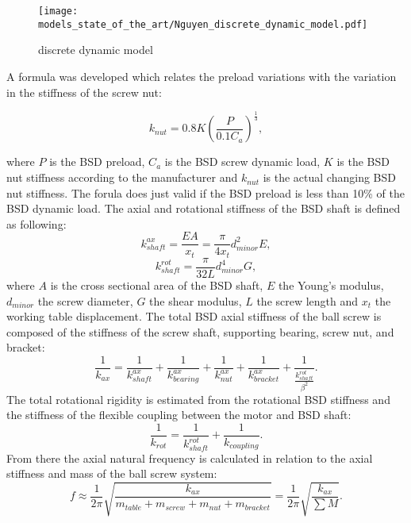 \begin{figure}[H]
  \centering
  \texttt{[image: models\_state\_of\_the\_art/Nguyen\_discrete\_dynamic\_model.pdf]}
  \caption{discrete dynamic model \cite{NGUYEN2019}}
  \label{fig:Nguyen_discrete_dynamic_model}
\end{figure}

A formula was developed which relates the preload variations with the variation in the stiffness of the screw nut: 

\begin{equation}
    k_{nut}=0.8K(\frac{P}{0.1C_{a}})^{\frac{1}{3}},
\end{equation}

where $P$ is the BSD preload, $C_{a}$ is the BSD screw dynamic load, $K$ is the BSD nut stiffness according to the manufacturer and $k_{nut}$ is the actual changing BSD nut stiffness. The forula does just valid if the BSD preload is less than 10\% of the BSD dynamic load. The axial and rotational stiffness of the BSD shaft is defined as following:
\begin{equation}
    k_{shaft}^{ax}=\frac{EA}{x_{t}}=\frac{\pi}{4x_{t}}d_{minor}^{2}E,
\end{equation}
\begin{equation}
    k_{shaft}^{rot}=\frac{\pi}{32L}d_{minor}^{4}G,
\end{equation}
 where $A$ is the cross sectional area of the BSD shaft, $E$ the Young’s modulus, $d_{minor}$ the screw diameter, $G$ the shear modulus, $L$ the screw length and $x_{t}$ the working table displacement. The total BSD axial stiffness of the ball screw is composed of the stiffness of the screw shaft, supporting bearing, screw nut, and bracket:
 \begin{equation}
    \frac{1}{k_{ax}}=\frac{1}{k_{shaft}^{ax}}+\frac{1}{k_{bearing}^{ax}}+\frac{1}{k_{nut}^{ax}}+\frac{1}{k_{bracket}^{ax}}+\frac{1}{\frac{k_{shaft}^{rot}}{\beta^{2}}}.
\end{equation}
The total rotational rigidity is estimated from the rotational BSD stiffness and the stiffness of the flexible coupling between the motor and BSD shaft:
 \begin{equation}
    \frac{1}{k_{rot}}=\frac{1}{k_{shaft}^{rot}}+\frac{1}{k_{coupling}}.
\end{equation}
From there the axial natural frequency is calculated in relation to the axial stiffness and mass of the ball screw system:
\begin{equation}
    f\approx\frac{1}{2\pi}\sqrt{\frac{k_{ax}}{m_{table}+m_{screw}+m_{nut}+m_{bracket}}}=\frac{1}{2\pi}\sqrt{\frac{k_{ax}}{\sum M}}.
\end{equation}

